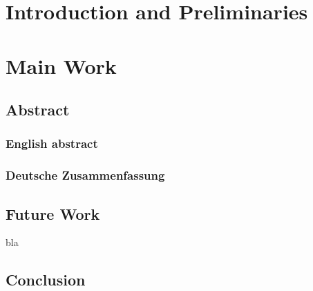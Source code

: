 \documentclass[
	a4paper,
	english,
	twoside,
	openright,               
	11pt                            
	]{report}
\begin{document}




\tableofcontents
 \cleardoublepage
%
%
\listoffigures
\cleardoublepage

\listoftables
\cleardoublepage

\cleardoublepage

 \part{Introduction and Preliminaries}
   \setcounter{page}{1}
 

 \part{Main Work}
\chapter{Abstract} %
\label{cha:abstract}

\section{English abstract} %
\label{sec:english_abstract}



\newpage

\section{Deutsche Zusammenfassung} %
\label{sec:deutsche_zusammenfassung}





\chapter{Future Work}\label{sec:futurework}

bla

\chapter{Conclusion}\label{sec:conclusion}
\end{document}
